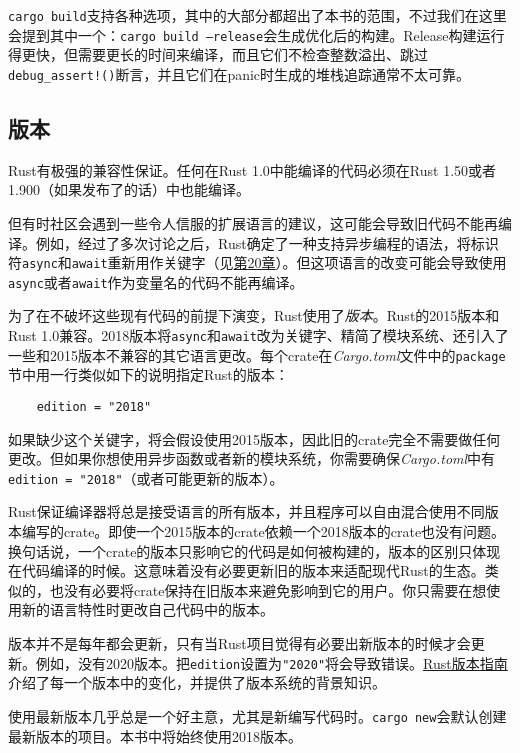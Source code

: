 \texttt{cargo build}支持各种选项，其中的大部分都超出了本书的范围，不过我们在这里会提到其中一个：\texttt{cargo build --release}会生成优化后的构建。Release构建运行得更快，但需要更长的时间来编译，而且它们不检查整数溢出、跳过\texttt{debug\_assert!()}断言，并且它们在panic时生成的堆栈追踪通常不太可靠。

\subsection{版本}

Rust有极强的兼容性保证。任何在Rust 1.0中能编译的代码必须在Rust 1.50或者1.900（如果发布了的话）中也能编译。


但有时社区会遇到一些令人信服的扩展语言的建议，这可能会导致旧代码不能再编译。例如，经过了多次讨论之后，Rust确定了一种支持异步编程的语法，将标识符\texttt{async}和\texttt{await}重新用作关键字（见\hyperref[ch20]{第20章}）。但这项语言的改变可能会导致使用\texttt{async}或者\texttt{await}作为变量名的代码不能再编译。

为了在不破坏这些现有代码的前提下演变，Rust使用了\emph{版本}。Rust的2015版本和Rust 1.0兼容。2018版本将\texttt{async}和\texttt{await}改为关键字、精简了模块系统、还引入了一些和2015版本不兼容的其它语言更改。每个crate在\emph{Cargo.toml}文件中的\texttt{package}节中用一行类似如下的说明指定Rust的版本：
\begin{verbatim}
    edition = "2018"
\end{verbatim}

如果缺少这个关键字，将会假设使用2015版本，因此旧的crate完全不需要做任何更改。但如果你想使用异步函数或者新的模块系统，你需要确保\emph{Cargo.toml}中有\texttt{edition = "2018"}（或者可能更新的版本）。

Rust保证编译器将总是接受语言的所有版本，并且程序可以自由混合使用不同版本编写的crate。即使一个2015版本的crate依赖一个2018版本的crate也没有问题。换句话说，一个crate的版本只影响它的代码是如何被构建的，版本的区别只体现在代码编译的时候。这意味着没有必要更新旧的版本来适配现代Rust的生态。类似的，也没有必要将crate保持在旧版本来避免影响到它的用户。你只需要在想使用新的语言特性时更改自己代码中的版本。

版本并不是每年都会更新，只有当Rust项目觉得有必要出新版本的时候才会更新。例如，没有2020版本。把\texttt{edition}设置为\texttt{"2020"}将会导致错误。\href{https://doc.rust-lang.org/stable/edition-guide}{Rust版本指南}介绍了每一个版本中的变化，并提供了版本系统的背景知识。

使用最新版本几乎总是一个好主意，尤其是新编写代码时。\texttt{cargo new}会默认创建最新版本的项目。本书中将始终使用2018版本。

